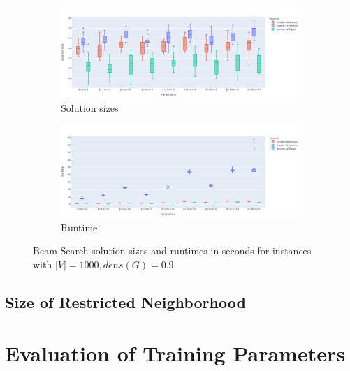 \documentclass[draft,final]{vutinfth} %
\begin{document}
\begin{figure}
    \centering
    \begin{subfigure}{\textwidth}
        \centering
        \includegraphics[width=\textwidth]{graphics/lbh-09-1000-size.pdf}
        \caption{Solution sizes}
    \end{subfigure}
    \begin{subfigure}{\textwidth}
        \centering
        \includegraphics[width=\textwidth]{graphics/lbh-09-1000-runtime.pdf}
        \caption{Runtime}
    \end{subfigure}
    \caption{Beam Search solution sizes and runtimes in seconds for instances with $|V|=1000, dens(G)=0.9$}
    \label{fig:bs-heuristics-random-4}
\end{figure}



\subsection{Size of Restricted Neighborhood}


\section{Evaluation of Training Parameters}\label{sec:train-params}
\end{document}
